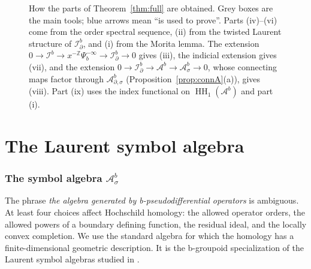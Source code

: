 \documentclass[11pt,oneside,reqno]{article}
\DeclareMathOperator{\HH}{HH}
\newcommand{\Z}{\mathbb Z}
\newcommand{\Ib}{\mathcal I^b}
\newcommand{\Idb}{\mathcal I^b_\partial}
\newcommand{\Ab}{\mathcal A^b}
\newcommand{\Asb}{\mathcal A^b_\sigma}
\newcommand{\Adsb}{\mathcal A^b_{\partial,\sigma}}
\theoremstyle{plain}
\theoremstyle{definition}
\theoremstyle{remark}
\begin{document}
\begin{figure}[tbp]
\caption[Roadmap of the main theorem]{How the parts of
Theorem~\ref{thm:full} are obtained. Grey boxes are the main tools; blue
arrows mean ``is used to prove''. Parts (iv)--(vi) come from the order
spectral sequence, (ii) from the twisted Laurent structure of \(\Idb\), and
(i) from the Morita lemma. The extension
\(0\to\Ib\to x^{-\Z}\Psi_b^{-\infty}\to\Idb\to0\) gives (iii), the indicial
extension gives (vii), and the extension \(0\to\Idb\to\Ab\to\Asb\to0\),
whose connecting maps factor through \(\Adsb\)
(Proposition~\ref{prop:connA}(a)), gives (viii). Part (ix) uses the index
functional on \(\HH_1(\Ab)\) and part (i).}
\label{fig:roadmap}
\end{figure}


\part{The Laurent symbol algebra}\label{part:symbols}

\section{\texorpdfstring{The symbol algebra \(\Asb\)}{The symbol algebra}}\label{sec:symbol}

The phrase \emph{the algebra generated by b-pseudodifferential operators} is
ambiguous. At least four choices affect Hochschild homology: the allowed
operator orders, the allowed powers of a boundary defining function, the
residual ideal, and the locally convex completion. We use the standard algebra
for which the homology has a finite-dimensional geometric description.
It is the b-groupoid specialization of the Laurent symbol algebras studied in
\cite{BNsymbols,BNfamilies}.
\end{document}
